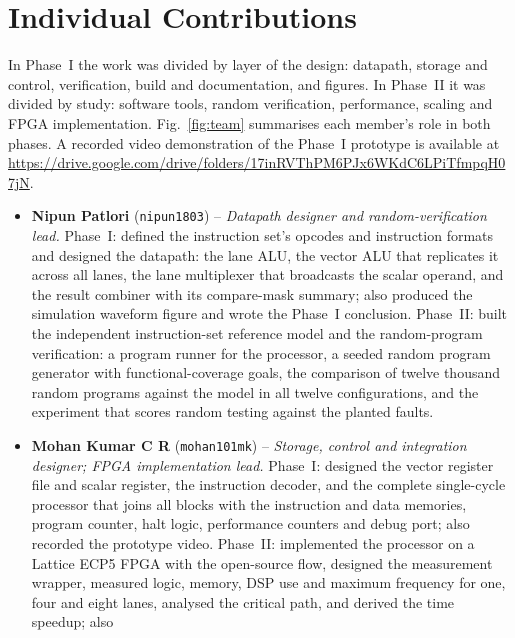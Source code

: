 \documentclass[conference]{IEEEtran}
\begin{document}
\section{Individual Contributions}
\label{sec:contrib}
In Phase~I the work was divided by layer of the design: datapath, storage and
control, verification, build and documentation, and figures. In Phase~II it
was divided by study: software tools, random verification, performance,
scaling and FPGA implementation. Fig.~\ref{fig:team} summarises each member's
role in both phases. A recorded video demonstration of the Phase~I prototype is
available at \url{https://drive.google.com/drive/folders/17inRVThPM6PJx6WKdC6LPiTfmpqH07jN}.

\begin{itemize}
\item \textbf{Nipun Patlori} (\texttt{nipun1803}) -- \emph{Datapath designer
      and random-verification lead.} Phase~I: defined the instruction
      set's opcodes and instruction formats and designed the datapath: the
      lane ALU, the vector ALU that replicates it across all lanes, the lane
      multiplexer that broadcasts the scalar operand, and the result combiner
      with its compare-mask summary; also produced the simulation waveform
      figure and wrote the Phase~I conclusion. Phase~II: built the
      independent instruction-set reference model and the random-program
      verification: a program runner for the processor, a seeded random
      program generator with functional-coverage goals, the comparison of
      twelve thousand random programs against the model in all twelve
      configurations, and the experiment that scores random testing against
      the planted faults.
\item \textbf{Mohan Kumar C R} (\texttt{mohan101mk}) -- \emph{Storage, control
      and integration designer; FPGA implementation lead.} Phase~I:
      designed the vector register file and scalar register, the instruction
      decoder, and the complete single-cycle processor that joins all blocks
      with the instruction and data memories, program counter, halt logic,
      performance counters and debug port; also recorded the prototype video.
      Phase~II: implemented the processor on a Lattice ECP5 FPGA with the
      open-source flow, designed the measurement wrapper, measured logic,
      memory, DSP use and maximum frequency for one, four and eight lanes,
      analysed the critical path, and derived the time speedup; also

\end{itemize}
\end{document}
